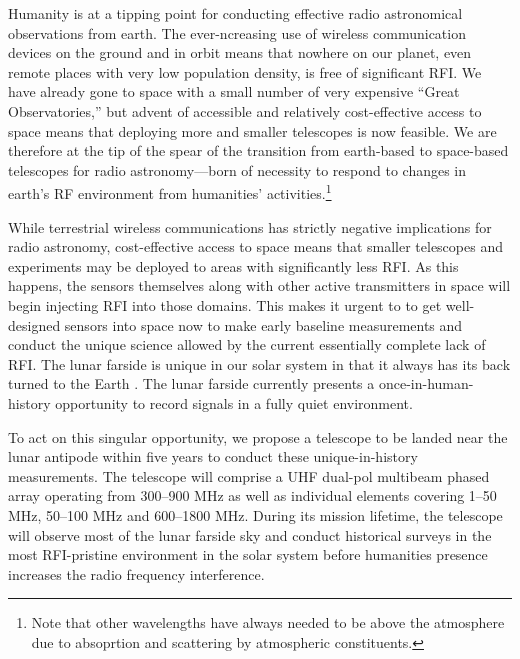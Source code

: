 Humanity is at a tipping point for conducting effective radio astronomical observations from earth. The ever-ncreasing use of wireless communication devices on the ground and in orbit means that nowhere on our planet, even  remote places with very low population density, is free of significant RFI. We have already gone to space with a small number of very expensive “Great Observatories,” but advent of accessible and relatively cost-effective access to space means that deploying more and smaller telescopes is now feasible. We are therefore at the tip of the spear of the transition from earth-based to space-based telescopes for radio astronomy---born of necessity to respond to changes in earth’s RF environment from humanities' activities.\footnote{Note that other wavelengths have always needed to be above the atmosphere due to absoprtion and scattering by atmospheric constituents.}  

While terrestrial wireless communications has strictly negative implications for radio astronomy, cost-effective access to space means that smaller telescopes and experiments may be deployed to areas with significantly less RFI. As this happens, the sensors themselves along with other active transmitters in space will begin injecting RFI into those domains. This makes it urgent to to get well-designed sensors into space now to make early baseline measurements and conduct the unique science allowed by the current essentially complete lack of RFI. The lunar farside is unique in our solar system in that it always has its back turned to the Earth \cite{heidmann2002,MACCONE2019233,michaud2020lunar}. The lunar farside currently presents a once-in-human-history opportunity to record signals in a fully quiet environment. 

To act on this singular opportunity, we propose a telescope to be landed near the lunar antipode within five years to conduct these unique-in-history measurements.  The telescope will comprise a UHF dual-pol multibeam phased array operating from 300--900 MHz as well as individual elements covering 1--50 MHz, 50--100 MHz and 600--1800 MHz.  During its mission lifetime, the telescope will observe most of the lunar farside sky and conduct historical surveys in the most RFI-pristine environment in the solar system before humanities presence increases the radio frequency interference.
